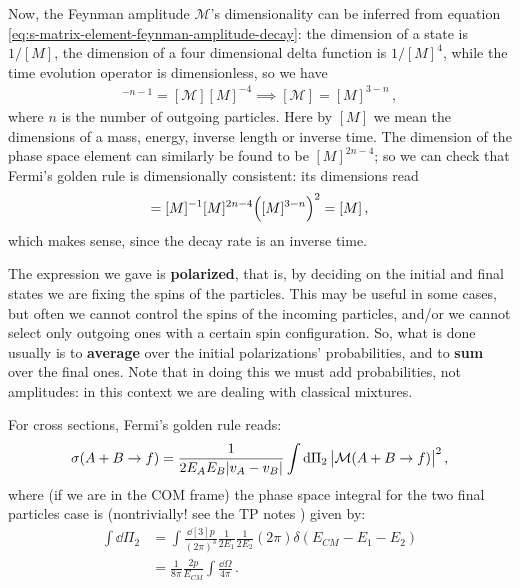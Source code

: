 \documentclass[main.tex]{subfiles}
\begin{document}
Now, the Feynman amplitude \(\mathcal{M}\)'s dimensionality can be inferred from equation \eqref{eq:s-matrix-element-feynman-amplitude-decay}: the dimension of a state is \(1 / [M]\), the dimension of a four dimensional delta function is \(1/ [M]^{4}\), while the time evolution operator is dimensionless, so we have 
%
\begin{align}
[M]^{-n-1} = 
[\mathcal{M}]  [M]^{-4} \implies [\mathcal{M}] = [M]^{3-n}
\,,
\end{align}
%
where \(n\) is the number of outgoing particles. Here by \([M]\) we mean the dimensions of a mass, energy, inverse length or inverse time. 
The dimension of the phase space element can similarly be found to be \([M]^{2n - 4}\); so we can check that Fermi's golden rule is dimensionally consistent: its dimensions read 
%
\begin{align}
[\Gamma_A ] = [M]^{-1} [M]^{2n-4}  \qty([M]^{3-n})^2 = [M]
\,,
\end{align}
%
which makes sense, since the decay rate is an inverse time.

The expression we gave is \textbf{polarized}, that is, by deciding on the initial and final states we are fixing the spins of the particles.
This may be useful in some cases, but often we cannot control the spins of the incoming particles, and/or we cannot select only outgoing ones with a certain spin configuration.
So, what is done usually is to \textbf{average} over the initial polarizations' probabilities, and to \textbf{sum} over the final ones. Note that in doing this we must add probabilities, not amplitudes: in this context we are dealing with classical mixtures.

For cross sections, Fermi's golden rule reads: 
%
\begin{align}
\sigma (A+B \to f) = \frac{1}{2 E_A E_B \abs{v_A - v_B}}
\int \dd{\Pi_2 } \abs{\mathcal{M}(A+B \to f)}^2
\,,
\end{align}
%
where (if we are in the COM frame) the phase space integral for the two final particles case is (nontrivially! see the TP notes \cite[sec.
 4.2.3]{tissinoTheoreticalPhysicsNotes2020}) given by: 
%
\begin{subequations}
\begin{align}
\int \dd{\Pi_{2}} &= \int \frac{\dd[3]{p}}{(2 \pi )^3} \frac{1}{2 E_1 } \frac{1}{2 E_2 } (2 \pi ) \delta (E_{CM} - E_1 - E_2 )   \\
&= \frac{1}{8 \pi } \frac{2p}{E_{CM}} \int  \frac{\dd{\Omega}}{4 \pi } 
\,.
\end{align}
\end{subequations}
\end{document}
